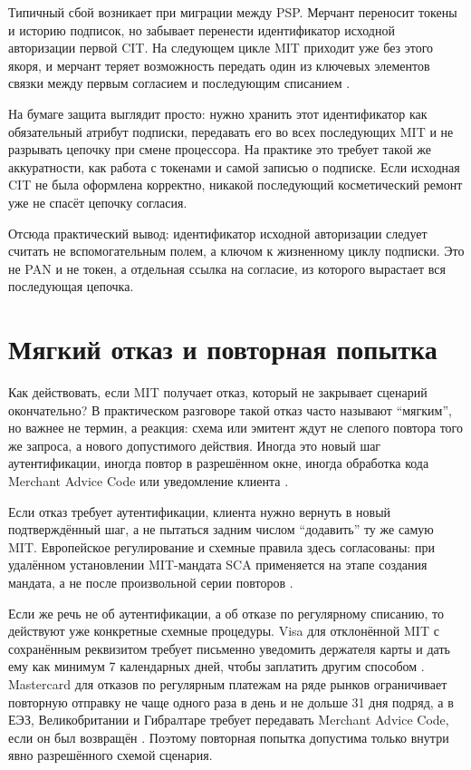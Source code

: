 Типичный сбой возникает при миграции между PSP. Мерчант переносит
токены и историю подписок, но забывает перенести идентификатор
исходной авторизации первой CIT. На следующем цикле MIT приходит уже
без этого якоря, и мерчант теряет возможность передать один из ключевых
элементов связки между первым согласием и последующим списанием
\cite{mc-tpr}\cite{cybs-mc-subscription-mit}.

На бумаге защита выглядит просто: нужно хранить этот идентификатор как
обязательный атрибут подписки, передавать его во всех последующих MIT и
не разрывать цепочку при смене процессора. На практике это требует
такой же аккуратности, как работа с токенами и самой записью о
подписке. Если исходная CIT не была оформлена корректно, никакой
последующий косметический ремонт уже не спасёт цепочку согласия.

Отсюда практический вывод: идентификатор исходной авторизации следует
считать не вспомогательным полем, а ключом к жизненному циклу подписки.
Это не PAN и не токен, а отдельная ссылка на согласие, из которого
вырастает вся последующая цепочка.

\section{Мягкий отказ и повторная попытка}
\label{sec:subscriptions-soft-decline}

Как действовать, если MIT получает отказ, который не закрывает сценарий
окончательно? В практическом разговоре такой отказ часто называют
\enquote{мягким}, но важнее не термин, а реакция: схема или эмитент ждут
не слепого повтора того же запроса, а нового допустимого действия.
Иногда это новый шаг аутентификации, иногда повтор в разрешённом окне,
иногда обработка кода Merchant Advice Code или уведомление клиента
\cite{visa-core-rules}\cite{mc-tpr}.

Если отказ требует аутентификации, клиента нужно вернуть в новый
подтверждённый шаг, а не пытаться задним числом \enquote{додавить} ту же
самую MIT. Европейское регулирование и схемные правила здесь
согласованы: при удалённом установлении MIT-мандата SCA применяется на
этапе создания мандата, а не после произвольной серии повторов
\cite{eba-mit-qa}\cite{mc-tpr}.

Если же речь не об аутентификации, а об отказе по регулярному списанию,
то действуют уже конкретные схемные процедуры. Visa для отклонённой MIT
с сохранённым реквизитом требует письменно уведомить держателя карты и
дать ему как минимум 7 календарных дней, чтобы заплатить другим
способом \cite{visa-core-rules}. Mastercard для отказов по
регулярным платежам на ряде рынков ограничивает повторную отправку не
чаще одного раза в день и не дольше 31 дня подряд, а в ЕЭЗ,
Великобритании и
Гибралтаре требует передавать Merchant Advice Code, если он был
возвращён
\cite{mc-tpr}. Поэтому повторная попытка допустима только внутри
явно разрешённого схемой сценария.

